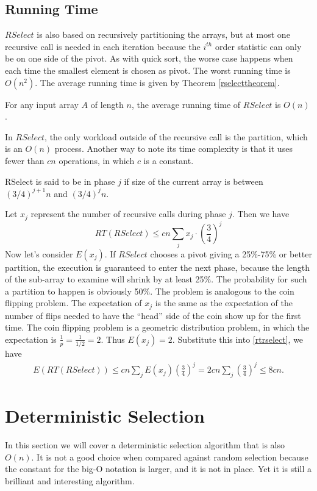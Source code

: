 \subsection{Running Time}
$RSelect$ is also based on recursively partitioning the arrays, but at most one recursive call is needed in each iteration because the $i^{th}$ order statistic can only be on one side of the pivot. As with quick sort, the worse case happens when each time the smallest element is chosen as pivot. The worst running time is $O(n^2)$. The average running time is given by Theorem \ref{rselecttheorem}.
\begin{theorem}\label{rselecttheorem}
For any input array $A$ of length $n$, the average running time of $RSelect$ is $O(n)$.
\end{theorem}
In $RSelect$, the only workload outside of the recursive call is the partition, which is an $O(n)$ process. Another way to note its time complexity is that it uses fewer than $cn$ operations, in which $c$ is a constant. 
\begin{definition}
RSelect is said to be in phase $j$ if size of the current array is between $(3/4)^{j+1}n$ and $(3/4)^jn$.
\end{definition}
Let $x_j$ represent the number of recursive calls during phase $j$. Then we have
\begin{equation}\label{rtrselect}
RT(RSelect)\leq cn\sum\limits_jx_j\cdot\left(\frac{3}{4}\right)^j
\end{equation}
Now let's consider $E(x_j)$. If $RSelect$ chooses a pivot giving a 25\%-75\% or better partition, the execution is guaranteed to enter the next phase, because the length of the sub-array to examine will shrink by at least 25\%. The probability for such a partition to happen is obviously 50\%. The problem is analogous to the coin flipping problem. The expectation of $x_j$ is the same as the expectation of the number of flips needed to have the ``head'' side of the coin show up for the first time. The coin flipping problem is a geometric distribution problem, in which the expectation is $\frac{1}{p}=\frac{1}{1/2}=2$. Thus $E(x_j)=2$. Substitute this into \eqref{rtrselect}, we have
\begin{align*}
E(RT(RSelect))\leq cn\sum\limits_jE(x_j)\left(\frac{3}{4}\right)^j=2cn\sum\limits_j\left(\frac{3}{4}\right)^j\leq8cn.
\end{align*}
\section{Deterministic Selection}
In this section we will cover a deterministic selection algorithm that is also $O(n)$. It is not a good choice when compared against random selection because the constant for the big-O notation is larger, and it is not in place. Yet it is still a brilliant and interesting algorithm.

